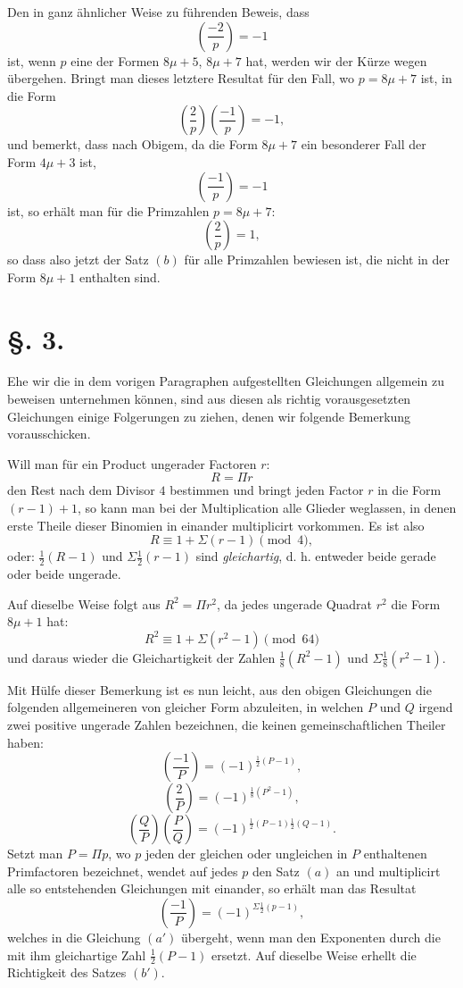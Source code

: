 \documentclass[11pt]{article}
\newcommand{\J}[2]{\left(\frac{#1}{#2}\right)}
\begin{document}
Den in ganz ähnlicher Weise zu führenden Beweis, dass
\[
 \J{-2}{p}=-1
\]
ist, wenn $p$ eine der Formen $8\mu+5$, $8\mu+7$ hat, werden wir der Kürze wegen übergehen. Bringt man dieses letztere Resultat für den Fall, wo $p=8\mu+7$ ist, in die Form
\[
 \J{2}{p}\J{-1}{p}=-1,
\]
und bemerkt, dass nach Obigem, da die Form $8\mu+7$ ein besonderer Fall der Form $4\mu+3$ ist,
\[
 \J{-1}{p}=-1
\]
ist, so erhält man für die Primzahlen $p=8\mu+7$:
\[
 \J{2}{p}=1,
\]
so dass also jetzt der Satz $(b)$ für alle Primzahlen bewiesen ist, die nicht in der Form $8\mu+1$ enthalten sind.

\section*{\S. 3.}

Ehe wir die in dem vorigen Paragraphen aufgestellten Gleichungen allgemein zu beweisen unternehmen können, sind aus diesen als richtig vorausgesetzten Gleichungen einige Folgerungen zu ziehen, denen wir folgende Bemerkung vorausschicken.

Will man für ein Product ungerader Factoren $r$:
\[
 R=\Pi r
\]
den Rest nach dem Divisor $4$ bestimmen und bringt jeden Factor $r$ in die Form $(r-1)+1$, so kann man bei der Multiplication alle Glieder weglassen, in denen erste Theile dieser Binomien in einander multiplicirt vorkommen. Es ist also
\[
 R\equiv 1+\Sigma(r-1)\pmod 4,
\]
oder: $\frac12(R-1)$ und $\Sigma\frac12(r-1)$ sind \emph{gleichartig}, d. h. entweder beide gerade oder beide ungerade.

Auf dieselbe Weise folgt aus $R^2=\Pi r^2$, da jedes ungerade Quadrat $r^2$ die Form $8\mu+1$ hat:
\[
 R^2\equiv 1+\Sigma(r^2-1)\pmod {64}
\]
und daraus wieder die Gleichartigkeit der Zahlen $\frac18(R^2-1)$ und $\Sigma\frac18(r^2-1)$.

Mit Hülfe dieser Bemerkung ist es nun leicht, aus den obigen Gleichungen die folgenden allgemeineren von gleicher Form abzuleiten, in welchen $P$ und $Q$ irgend zwei positive ungerade Zahlen bezeichnen, die keinen gemeinschaftlichen Theiler haben:
\[
\tag{a'} \J{-1}{P}=(-1)^{\frac12(P-1)},
\]
\[
\tag{b'} \J{2}{P}=(-1)^{\frac18(P^2-1)},
\]
\[
\tag{c'} \J{Q}{P}\J{P}{Q}=(-1)^{\frac12(P-1)\frac12(Q-1)}.
\]
Setzt man $P=\Pi p$, wo $p$ jeden der gleichen oder ungleichen in $P$ enthaltenen Primfactoren bezeichnet, wendet auf jedes $p$ den Satz $(a)$ an und multiplicirt alle so entstehenden Gleichungen mit einander, so erhält man das Resultat
\[
 \J{-1}{P}=(-1)^{\Sigma\frac12(p-1)},
\]
welches in die Gleichung $(a')$ übergeht, wenn man den Exponenten durch die mit ihm gleichartige Zahl $\frac12(P-1)$ ersetzt. Auf dieselbe Weise erhellt die Richtigkeit des Satzes $(b')$.
\end{document}
